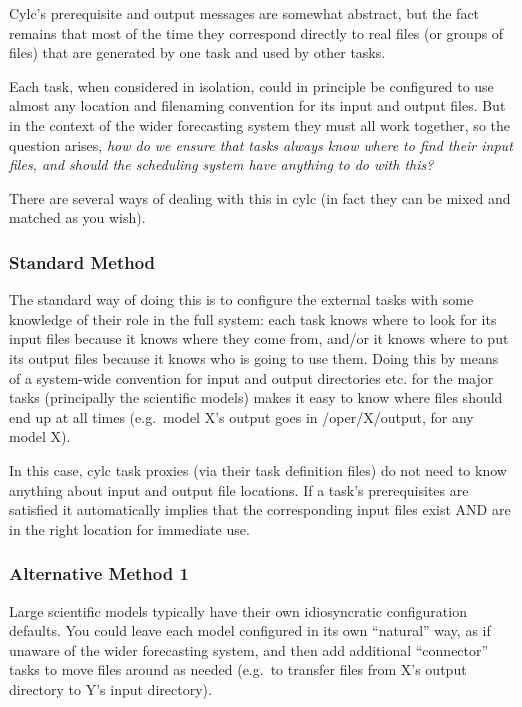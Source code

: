 \documentclass[11pt,a4paper]{article}
\begin{document}
Cylc's prerequisite and output messages are somewhat abstract, but the
fact remains that most of the time they correspond directly to real 
files (or groups of files) that are generated by one task and used by
other tasks.

Each task, when considered in isolation, could in principle be
configured to use almost any location and filenaming convention for its
input and output files. But in the context of the wider forecasting
system they must all work together, so the question arises, {\em how do
we ensure that tasks always know where to find their input files, and
should the scheduling system have anything to do with this?} 

There are several ways of dealing with this in cylc (in fact they can
be mixed and matched as you wish). 

\subsubsection{Standard Method}

The standard way of doing this is to configure the external tasks with
some knowledge of their role in the full system: each task knows where
to look for its input files because it knows where they come from,
and/or it knows where to put its output files because it knows who is
going to use them. Doing this by means of a system-wide convention for 
input and output directories  etc. for the major tasks (principally the
scientific models) makes it easy to know where files should end up at
all times (e.g.\ model X's output goes in /oper/X/output, for any model
X).

In this case, cylc task proxies (via their task definition files) do not
need to know anything about input and output file locations. If a task's
prerequisites are satisfied it automatically implies that the
corresponding input files exist AND are in the right location for
immediate use.

\subsubsection{Alternative Method 1}

Large scientific models typically have their own idiosyncratic
configuration defaults. You could leave each model configured in its own
``natural'' way, as if unaware of the wider forecasting system, and then
add additional ``connector'' tasks to move files around as needed
(e.g.\ to transfer files from X's output directory to Y's input directory).
\end{document}
